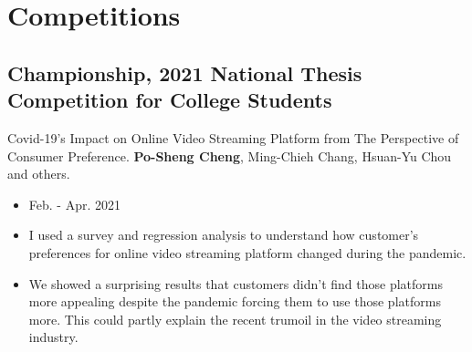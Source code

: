 \documentclass[12pt]{article}
\begin{document}
        \section*{Competitions}
        \subsection*{Championship, 2021 National Thesis Competition for College Students}
        {\sffamily
        {\footnotesize Covid-19's Impact on Online Video Streaming Platform from The Perspective of Consumer Preference. \textbf{Po-Sheng Cheng}, Ming-Chieh Chang, Hsuan-Yu Chou and others.}
        \begin{itemize}
            \item Feb. - Apr. 2021
            \item I used a survey and regression analysis to understand how customer's preferences for online video streaming platform changed during the pandemic.
            \item We showed a surprising results that customers didn't find those platforms more appealing despite the pandemic forcing them to use those platforms more.
            This could partly explain the recent trumoil in the video streaming industry. 
        \end{itemize}
        }
\end{document}

